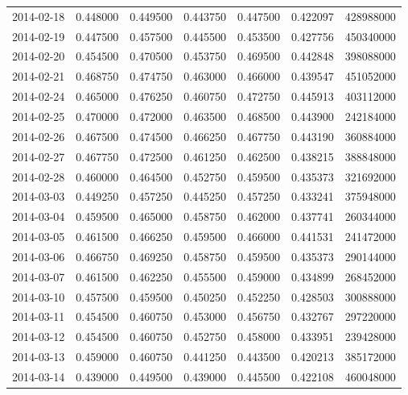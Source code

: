 \begin{tabular}{lrrrrrr}
2014-02-18 &    0.448000 &    0.449500 &    0.443750 &    0.447500 &    0.422097 &   428988000 \\
2014-02-19 &    0.447500 &    0.457500 &    0.445500 &    0.453500 &    0.427756 &   450340000 \\
2014-02-20 &    0.454500 &    0.470500 &    0.453750 &    0.469500 &    0.442848 &   398088000 \\
2014-02-21 &    0.468750 &    0.474750 &    0.463000 &    0.466000 &    0.439547 &   451052000 \\
2014-02-24 &    0.465000 &    0.476250 &    0.460750 &    0.472750 &    0.445913 &   403112000 \\
2014-02-25 &    0.470000 &    0.472000 &    0.463500 &    0.468500 &    0.443900 &   242184000 \\
2014-02-26 &    0.467500 &    0.474500 &    0.466250 &    0.467750 &    0.443190 &   360884000 \\
2014-02-27 &    0.467750 &    0.472500 &    0.461250 &    0.462500 &    0.438215 &   388848000 \\
2014-02-28 &    0.460000 &    0.464500 &    0.452750 &    0.459500 &    0.435373 &   321692000 \\
2014-03-03 &    0.449250 &    0.457250 &    0.445250 &    0.457250 &    0.433241 &   375948000 \\
2014-03-04 &    0.459500 &    0.465000 &    0.458750 &    0.462000 &    0.437741 &   260344000 \\
2014-03-05 &    0.461500 &    0.466250 &    0.459500 &    0.466000 &    0.441531 &   241472000 \\
2014-03-06 &    0.466750 &    0.469250 &    0.458750 &    0.459500 &    0.435373 &   290144000 \\
2014-03-07 &    0.461500 &    0.462250 &    0.455500 &    0.459000 &    0.434899 &   268452000 \\
2014-03-10 &    0.457500 &    0.459500 &    0.450250 &    0.452250 &    0.428503 &   300888000 \\
2014-03-11 &    0.454500 &    0.460750 &    0.453000 &    0.456750 &    0.432767 &   297220000 \\
2014-03-12 &    0.454500 &    0.460750 &    0.452750 &    0.458000 &    0.433951 &   239428000 \\
2014-03-13 &    0.459000 &    0.460750 &    0.441250 &    0.443500 &    0.420213 &   385172000 \\
2014-03-14 &    0.439000 &    0.449500 &    0.439000 &    0.445500 &    0.422108 &   460048000 \\

\end{tabular}
